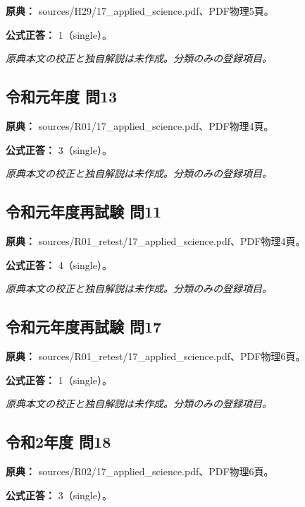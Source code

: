 \noindent\textbf{原典：} sources/H29/17\_applied\_science.pdf、PDF物理5頁。

\textbf{公式正答：} 1（single）。

\par\textit{原典本文の校正と独自解説は未作成。分類のみの登録項目。}

\subsection{令和元年度 問13}
\label{q:r01-reg-applied-13}

\noindent\textbf{原典：} sources/R01/17\_applied\_science.pdf、PDF物理4頁。

\textbf{公式正答：} 3（single）。

\par\textit{原典本文の校正と独自解説は未作成。分類のみの登録項目。}

\subsection{令和元年度再試験 問11}
\label{q:r01-ret-applied-11}

\noindent\textbf{原典：} sources/R01\_retest/17\_applied\_science.pdf、PDF物理4頁。

\textbf{公式正答：} 4（single）。

\par\textit{原典本文の校正と独自解説は未作成。分類のみの登録項目。}

\subsection{令和元年度再試験 問17}
\label{q:r01-ret-applied-17}

\noindent\textbf{原典：} sources/R01\_retest/17\_applied\_science.pdf、PDF物理6頁。

\textbf{公式正答：} 1（single）。

\par\textit{原典本文の校正と独自解説は未作成。分類のみの登録項目。}

\subsection{令和2年度 問18}
\label{q:r02-reg-applied-18}

\noindent\textbf{原典：} sources/R02/17\_applied\_science.pdf、PDF物理6頁。

\textbf{公式正答：} 3（single）。

